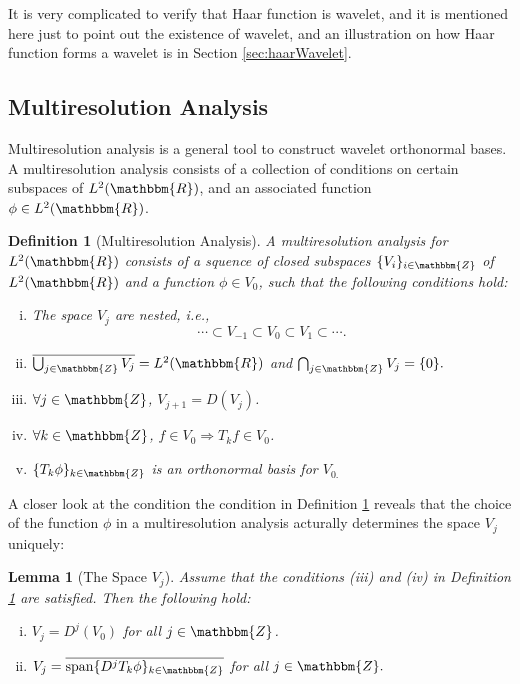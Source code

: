\documentclass{book}
\newcommand{\tmop}[1]{\ensuremath{\operatorname{#1}}}
\newenvironment{enumerateroman}{\begin{enumerate}[i.] }{\end{enumerate}}
\newtheorem{definition}{Definition}
{\theorembodyfont{\rmfamily}\newtheorem{example}{Example}}
\newtheorem{lemma}{Lemma}
\begin{document}
It is very complicated to verify that Haar function is wavelet, and it is
mentioned here just to point out the existence of wavelet, and an illustration
on how Haar function forms a wavelet is in Section \ref{sec:haarWavelet}.

\subsection{Multiresolution Analysis}

Multiresolution analysis is a general tool to construct wavelet orthonormal
bases. A multiresolution analysis consists of a collection of conditions on
certain subspaces of $L^2 (\mathbbm{R})$, and an associated function $\phi \in
L^2 (\mathbbm{R})$.

\begin{definition}[Multiresolution Analysis]
  \label{def:multiresolutionAnalysis}A multiresolution analysis for $L^2
  (\mathbbm{R})$ consists of a squence of closed subspaces $\{ V_i \}_{i \in
  \mathbbm{Z}}$ of $L^2 (\mathbbm{R})$ and a function $\phi \in V_0$, such
  that the following conditions hold:
  \begin{enumerateroman}
    \item The space $V_j$ are nested, i.e.,
    \[ \cdots \subset V_{- 1} \subset V_0 \subset V_1 \subset \cdots . \]
    \item $\overline{\bigcup_{j \in \mathbbm{Z}} V_j} = L^2 (\mathbbm{R})$ and
    $\bigcap_{j \in \mathbbm{Z}} V_j = \{ 0 \} .$
    
    \item $\forall j \in \mathbbm{Z}$, $V_{j + 1} = D (V_j)$.
    
    \item $\forall k \in \mathbbm{Z}$, $f \in V_0 \Rightarrow T_k f \in V_0$.
    
    \item $\{ T_k \phi \}_{k \in \mathbbm{Z}}$ is an orthonormal basis for
    $V_{0.}$
  \end{enumerateroman}
\end{definition}

A closer look at the condition the condition in Definition
\ref{def:multiresolutionAnalysis} reveals that the choice of the function
$\phi$ in a multiresolution analysis acturally determines the space $V_j$
uniquely:

\begin{lemma}[The Space $V_j$]
  \label{lem:spaceVj}Assume that the conditions (iii) and (iv) in Definition
  \ref{def:multiresolutionAnalysis} are satisfied. Then the following hold:
  \begin{enumerateroman}
    \item $V_j = D^j (V_0)$ for all $j \in \mathbbm{Z}$.
    
    \item $V_j = \overline{\tmop{span} \{ D^j T_k \phi \}_{k \in
    \mathbbm{Z}}}$ for all $j \in \mathbbm{Z}.$
  \end{enumerateroman}
\end{lemma}
\end{document}
